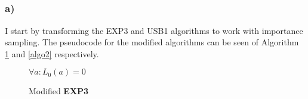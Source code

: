 \documentclass[a4paper]{article}
\begin{document}
\subsection{}
\label{subsec:22}
\subsubsection*{a)}
I start by transforming the EXP3 and USB1 algorithms to work with importance
sampling.
The pseudocode for the modified algorithms can be seen of Algorithm \ref{algo1}
and \ref{algo2} respectively.
\begin{figure}[ht]
\begin{algorithm}[H]
 \caption{Modified \textbf{EXP3}}
 \label{algo1}
 \DontPrintSemicolon
 $\forall a: L_0(a) = 0$\;
\end{algorithm}
\end{figure}
\end{document}

